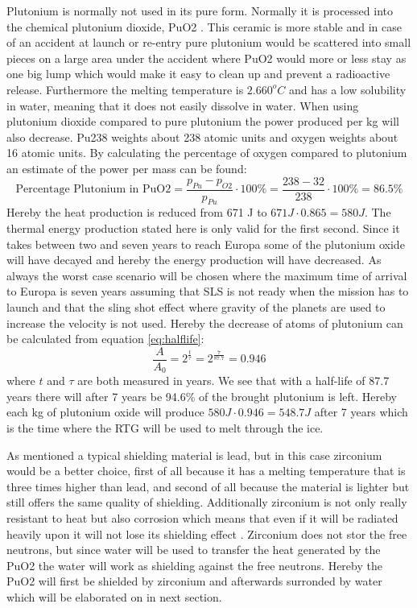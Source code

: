\noindent
Plutonium is normally not used in its pure form. Normally it is processed into the chemical plutonium dioxide, PuO2 \cite{website:plutoniumoxide}. This ceramic is more stable and in case of an accident at launch or re-entry pure plutonium would be scattered into small pieces on a large area under the accident where PuO2 would more or less stay as one big lump which would make it easy to clean up and prevent a radioactive release. Furthermore the melting temperature is $2.660^oC$ and has a low solubility in water, meaning that it does not easily dissolve in water. When using plutonium dioxide compared to pure plutonium the power produced per kg will also decrease. Pu238 weights about 238 atomic units and oxygen weights about 16 atomic units. By calculating the percentage of oxygen compared to plutonium an estimate of the power per mass can be found: 
\begin{equation*}
\text{Percentage Plutonium in PuO2} = \frac{p_{Pu} - p_{O2}}{p_{Pu}}\cdot 100\% = \frac{238 - 32}{238}\cdot 100\% = 86.5\% 
\end{equation*}
Hereby the heat production is reduced from 671 J to $671J \cdot 0.865 = 580J$. The thermal energy production stated here is only valid for the first second. Since it takes between two and seven years to reach Europa some of the plutonium oxide will have decayed and hereby the energy production will have decreased. As always the worst case scenario will be chosen where the maximum time of arrival to Europa is seven years assuming that SLS is not ready when the mission has to launch and that the sling shot effect where gravity of the planets are used to increase the velocity is not used. Hereby the decrease of atoms of plutonium can be calculated from equation \ref{eq:halflife}: 
\begin{equation}
\frac{A}{A_0} = 2^{\frac{t}{\tau}} = 2^{\frac{7}{87.7}} = 0.946
\end{equation}
where  $t$ and $\tau$ are both measured in years. We see that with a half-life of 87.7 years there will after 7 years be 94.6\% of the brought plutonium is left. Hereby each kg of plutonium oxide will produce $580J \cdot 0.946 = 548.7J$ after 7 years which is the time where the RTG will be used to melt through the ice.

 \label{sec:shielding}
As mentioned a typical shielding material is lead, but in this case zirconium would be a better choice, first of all because it has a melting temperature that is three times higher than lead, and second of all because the material is lighter but still offers the same quality of shielding. Additionally zirconium is not only really resistant to heat but also corrosion which means that even if it will be radiated heavily upon it will not lose its shielding effect \cite{website:zirc}. Zirconium does not stor the free neutrons, but since water will be used to transfer the heat generated by the PuO2 the water will work as shielding against the free neutrons. Hereby the PuO2 will first be shielded by zirconium and afterwards surronded by water which will be elaborated on in next section.

